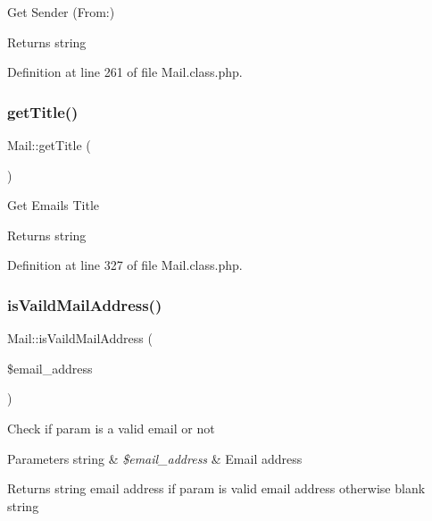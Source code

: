 Get Sender (From\+:)

\begin{DoxyReturn}{Returns}
string 
\end{DoxyReturn}


Definition at line 261 of file Mail.\+class.\+php.

\hypertarget{classMail_aa03664254d34901e8545fa3725224e92}{}\label{classMail_aa03664254d34901e8545fa3725224e92} 
\subsubsection{\texorpdfstring{get\+Title()}{getTitle()}}
{\footnotesize\ttfamily Mail\+::get\+Title (\begin{DoxyParamCaption}{ }\end{DoxyParamCaption})}

Get Email\textquotesingle{}s Title

\begin{DoxyReturn}{Returns}
string 
\end{DoxyReturn}


Definition at line 327 of file Mail.\+class.\+php.

\hypertarget{classMail_a2d7fd899ae79dc18e7804a044127dbac}{}\label{classMail_a2d7fd899ae79dc18e7804a044127dbac} 
\subsubsection{\texorpdfstring{is\+Vaild\+Mail\+Address()}{isVaildMailAddress()}}
{\footnotesize\ttfamily Mail\+::is\+Vaild\+Mail\+Address (\begin{DoxyParamCaption}\item[{}]{\$email\+\_\+address }\end{DoxyParamCaption})}

Check if param is a valid email or not


\begin{DoxyParams}[1]{Parameters}
string & {\em \$email\+\_\+address} & Email address \\
\hline
\end{DoxyParams}
\begin{DoxyReturn}{Returns}
string email address if param is valid email address otherwise blank string 
\end{DoxyReturn}


